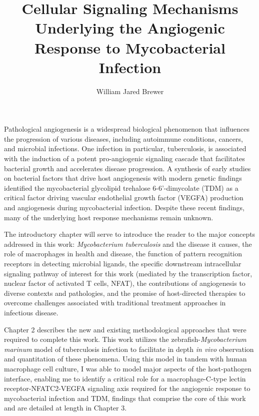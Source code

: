 \documentclass[PhD]{dukethesis2006}
\author{William Jared Brewer}
\title{Cellular Signaling Mechanisms Underlying the Angiogenic Response to Mycobacterial Infection}
\begin{document}
\maketitle{}

\makeabstract{}

\Copyright

\setlength\parindent{12pt}

\abstract

Pathological angiogenesis is a widespread biological phenomenon that influences the progression of various diseases, including autoimmune conditions, cancers, and microbial infections. One infection in particular, tuberculosis, is associated with the induction of a potent pro-angiogenic signaling cascade that facilitates bacterial growth and accelerates disease progression. A synthesis of early studies on bacterial factors that drive host angiogenesis with modern genetic findings identified the mycobacterial glycolipid trehalose 6-6'-dimycolate (TDM) as a critical factor driving vascular endothelial growth factor (VEGFA) production and angiogenesis during mycobacterial infection. Despite these recent findings, many of the underlying host response mechanisms remain unknown. 

The introductory chapter will serve to introduce the reader to the major concepts addressed in this work: \textit{Mycobacterium tuberculosis} and the disease it causes, the role of macrophages in health and disease, the function of pattern recognition receptors in detecting microbial ligands, the specific downstream intracellular signaling pathway of interest for this work (mediated by the transcription factor, nuclear factor of activated T cells, NFAT), the contributions of angiogenesis to diverse contexts and pathologies, and the promise of host-directed therapies to overcome challenges associated with traditional treatment approaches in infectious disease. 

Chapter 2 describes the new and existing methodological approaches that were required to complete this work. This work utilizes the zebrafish-\textit{Mycobacterium marinum} model of tuberculosis infection to facilitate in depth \textit{in vivo} observation and quantitation of these phenomena. Using this model in tandem with human macrophage cell culture, I was able to model major aspects of the host-pathogen interface, enabling me to identify a critical role for a macrophage-C-type lectin receptor-NFATC2-VEGFA signaling axis required for the angiogenic response to mycobacterial infection and TDM, findings that comprise the core of this work and are detailed at length in Chapter 3. 
\end{document}
